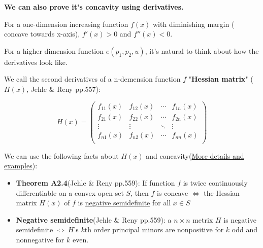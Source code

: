 \documentclass{article}
\begin{document}
\begin{mdframed}[backgroundcolor=blue!20,linecolor=white]
\vspace{2mm}


\textbf{We can also prove it's concavity using derivatives.} 

For a one-dimension increasing function $f(x)$ with diminishing margin (
concave towards x-axis), $f'(x)>0$ and $f''(x)<0$. 

For a higher dimension function $e(p_1,p_2,u)$, it's natural to think about how the derivatives look like.


\vspace{2mm}

We call the second derivatives of a n-demension function $f$ "\textbf{Hessian matrix}" ($H(x)$, Jehle \& Reny pp.557):

\begin{equation}
H(x)=\left(
    \begin{array}{cccc}
		f_{11}(x) & f_{12}(x) & \cdots & f_{1n}(x) \\
		f_{21}(x) & f_{22}(x) & \cdots & f_{2n}(x) \\
		\vdots    &    \vdots & \ddots &   \vdots \\
		f_{n1}(x) & f_{n2}(x) & \cdots & f_{nn}(x) \\
    \end{array}
    \right)
\label{eq:hessian}   
\end{equation}

\vspace{2mm}

We can use the following facts about $H(x)$ and concavity(\href{https://mjo.osborne.economics.utoronto.ca/index.php/tutorial/index/1/qfs/t\#:~:text=Finally\%2C\%20the\%20matrix\%20has\%20one,namely\%20its\%20determinant\%2C\%20\%E2\%88\%9219.&text=A\%20is\%20positive\%20semidefinite\%20if,and\%20nonnegative\%20for\%20k\%20even.}{More details and examples}):

\begin{itemize}
\item  \textbf{Theorem A2.4}(Jehle \& Reny pp.559): If function $f$ is twice continuously differentiable on a convex open set $S$, then 
$f$ is concave $\iff$ the Hessian matrix $H(x)$ of $f$ is \href{https://towardsdatascience.com/what-is-a-positive-definite-matrix-181e24085abd}{negative semidefinite} for all $x \in S$

\item \textbf{Negative semidefinite}(Jehle \& Reny pp.559): a $n \times n$ metrix $H$ is negative semidefinite $\iff \ H$'s $k$th order principal minors are nonpositive for $k$ odd and nonnegative for $k$ even.


\end{itemize}
\end{mdframed}
\end{document}
